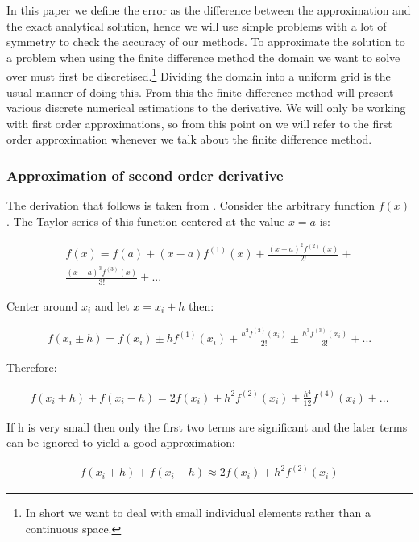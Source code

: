 \documentclass[aps,twocolumn,pre,nofootinbib,10pt]{revtex4-1}
\begin{document}
\par\hspace{4mm} In this paper we define the error as the difference between the approximation and the exact analytical solution, hence we will use simple problems with a lot of symmetry to check the accuracy of our methods. To approximate the solution to a problem when using the finite difference method the domain we want to solve over must first be discretised.\footnote{In short we want to deal with small individual elements rather than a continuous space.} Dividing the domain into a uniform grid is the usual manner of doing this. From this the finite difference method will present various discrete numerical estimations to the derivative. We will only be working with first order approximations, so from this point on we will refer to the first order approximation whenever we talk about the finite difference method.

\subsubsection{Approximation of second order derivative}
The derivation that follows is taken from \cite{compmethods}. Consider the arbitrary function \(f(x)\). The Taylor series of this function centered at the value \(x=a\) is:

\begin{gather*}
f(x) = f(a) +(x-a)f^{(1)}(x)+\frac{(x-a)^{2}f^{(2)}(x)}{2!}+ \\
\frac{(x-a)^{3}f^{(3)}(x)}{3!}+...
\end{gather*}

Center around $x_i$ and let \(x=x_i + h\) then:

\begin{gather*}
f(x_i\pm h)=f(x_i) \pm hf^{(1)}(x_i)+\frac{h^2f^{(2)}(x_i)}{2!} \pm \frac{h^3f^{(3)}(x_i)}{3!}+...
\end{gather*}

Therefore:

\begin{gather*}
f(x_i+h)+f(x_i-h) = 2f(x_i) + h^2f^{(2)}(x_i) +\frac{h^4}{12}f^{(4)}(x_i)+...
\end{gather*}

If h is very small then only the first two terms are significant and the later terms can be ignored to yield a good approximation:

\begin{gather*}
f(x_i+h)+f(x_i-h) \approx 2f(x_i) + h^2f^{(2)}(x_i)
\end{gather*}
\end{document}
